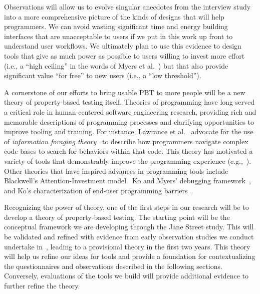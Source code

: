 Observations will allow us to evolve singular anecdotes from the interview study
into a more comprehensive picture of the kinds of designs that will help
programmers.  We can avoid wasting significant time and energy building
interfaces that are unacceptable to users if we put in this work up front to
understand user workflows.  We ultimately plan to use this evidence to design tools
that give as much power as possible to users willing to invest more effort
(i.e., a ``high ceiling'' in the words of Myers et al.~\cite{ref:myers2000past}) but
that also provide significant value ``for free'' to new users (i.e., a ``low
threshold'').


%
A cornerstone of our efforts to bring usable PBT to more people
will be a new theory of property-based testing itself.  Theories of
programming have
long served a critical role in human-centered software engineering
research, providing rich and memorable descriptions of programming
processes and clarifying opportunities to improve tooling and training.
For instance, Lawrance et al.~\cite{ref:lawrance2010programmers} advocate for the use of {\em information foraging
  theory}~\cite{ref:pirolli2003exploring} to
describe how programmers navigate complex code bases to search for behaviors
within that code. This
theory has motivated a variety of tools that demonstrably improve the
programming experience (e.g.,~\cite{ref:henley2014patchworks}).  Other theories
that have inspired advances in programming tools include
Blackwell's Attention-Investment model~\cite{ref:blackwell2002first} Ko and
Myers' debugging framework~\cite{ref:ko2005framework}, and Ko's characterization
of end-user programming barriers~\cite{ref:ko2004six}.

Recognizing the power of theory, one of the first steps in our
research will be to develop a theory of property-based
testing. The starting point
will be the conceptual framework we are developing through the Jane Street study. This
will be validated and refined with evidence from early observation studies we
conduct undertake in~, leading to a
provisional theory in the first two years.
This theory will help us
refine our ideas for
tools and provide a foundation for contextualizing the questionnaires and
observations described in the following sections. Conversely, evaluations of
the tools we build will provide additional evidence to further
refine the theory.

